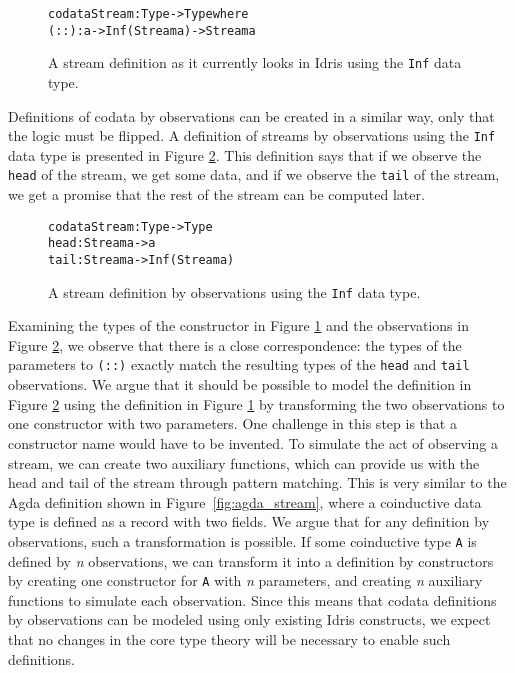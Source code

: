 \begin{figure}
\begin{alltt}
codata Stream : Type -> Type where
  (::) : a -> Inf (Stream a) -> Stream a
\end{alltt}
\caption{A stream definition as it currently looks in Idris using the \texttt{Inf} data type.}
\label{fig:stream_current_Inf}
\end{figure}

Definitions of codata by observations can be created in a similar way, only that the logic must be flipped. A definition of streams by observations using the \texttt{Inf} data type is presented in Figure \ref{fig:stream_copatterns_Inf}. This definition says that if we observe the \texttt{head} of the stream, we get some data, and if we observe the \texttt{tail} of the stream, we get a promise that the rest of the stream can be computed later.

\begin{figure}
\begin{alltt}
codata Stream : Type -> Type
  head : Stream a -> a
  tail : Stream a -> Inf (Stream a)
\end{alltt}
\caption{A stream definition by observations using the \texttt{Inf} data type.}
\label{fig:stream_copatterns_Inf}
\end{figure}

Examining the types of the constructor in Figure \ref{fig:stream_current_Inf} and the observations in Figure \ref{fig:stream_copatterns_Inf}, we observe that there is a close correspondence: the types of the parameters to \texttt{(::)} exactly match the resulting types of the \texttt{head} and \texttt{tail} observations. We argue that it should be possible to model the definition in Figure \ref{fig:stream_copatterns_Inf} using the definition in Figure \ref{fig:stream_current_Inf} by transforming the two observations to one constructor with two parameters. One challenge in this step is that a constructor name would have to be invented. To simulate the act of observing a stream, we can create two auxiliary functions, which can provide us with the head and tail of the stream through pattern matching. This is very similar to the Agda definition shown in Figure~\ref{fig:agda_stream}, where a coinductive data type is defined as a record with two fields. We argue that for any definition by observations, such a transformation is possible. If some coinductive type \texttt{A} is defined by \emph{n} observations, we can transform it into a definition by constructors by creating one constructor for \texttt{A} with \emph{n} parameters, and creating \emph{n} auxiliary functions to simulate each observation. Since this means that codata definitions by observations can be modeled using only existing Idris constructs, we expect that no changes in the core type theory will be necessary to enable such definitions.

